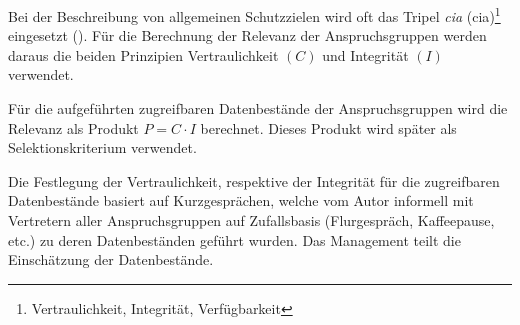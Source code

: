\documentclass[../../main.tex]{subfiles}
\begin{document}
\begin{sloppypar}
Bei der Beschreibung von allgemeinen Schutzzielen wird oft das Tripel \textit{\acrlong{cia}} (\acrshort{cia})\footnote{Vertraulichkeit, Integrität, Verfügbarkeit} eingesetzt (\cite{harris_cissp_2013}). Für die Berechnung der Relevanz der Anspruchsgruppen werden daraus die beiden Prinzipien Vertraulichkeit $(C)$ und Integrität $(I)$ verwendet.

Für die aufgeführten zugreifbaren Datenbestände der Anspruchsgruppen wird die Relevanz als Produkt $P =  C \cdot I$ berechnet. Dieses Produkt wird später als Selektionskriterium verwendet.

Die Festlegung der Vertraulichkeit, respektive der Integrität für die zugreifbaren Datenbestände basiert auf Kurzgesprächen, welche vom Autor informell mit Vertretern aller Anspruchsgruppen auf Zufallsbasis (Flurgespräch, Kaffeepause, etc.) zu deren Datenbeständen geführt wurden. Das Management teilt die Einschätzung der Datenbestände.
\end{sloppypar}

\end{document}
